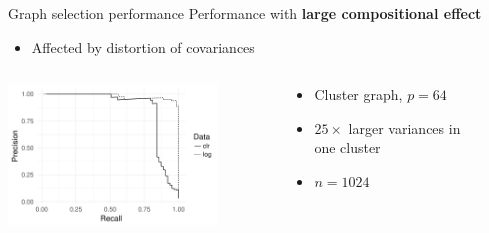 \documentclass[professionalfonts]{beamer}
\begin{document}
\begin{frame}{Graph selection performance}
Performance with \textbf{large compositional effect}
\begin{itemize}
\item Affected by distortion of covariances
\end{itemize}
\begin{columns}
\begin{column}{0.6\textwidth}
\begin{center}
\includegraphics[width=210px]{figs/cluster-pr.pdf}
\end{center}
\end{column}
\begin{column}{0.35\textwidth}
\begin{small}
\begin{itemize}
\item Cluster graph, $p = 64$
\item $25\times$ larger variances in \\ one cluster
\item $n = 1024$
\end{itemize}
\end{small}
\end{column}
\end{columns}
\end{frame}
\end{document}
